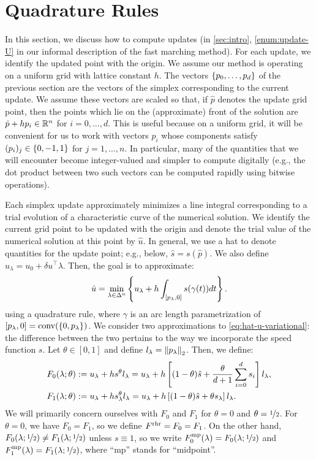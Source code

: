\documentclass[eikonal.tex]{subfiles}
\begin{document}
\section{Quadrature Rules}

In this section, we discuss how to compute updates (in
\cref{sec:intro}, \cref{enum:update-U} in our informal description of
the fast marching method). For each update, we identify the updated
point with the origin. We assume our method is operating on a uniform
grid with lattice constant $h$. The vectors $\left\{p_0, \hdots, p_d\right\}$
of the previous section are the vectors of the simplex corresponding
to the current update. We assume these vectors are scaled so that, if
$\hat{p}$ denotes the update grid point, then the points which lie on
the (approximate) front of the solution are $\hat{p} + h p_i \in \mathbb{R}^n$
for $i = 0, \hdots, d$. This is useful because on a uniform grid, it
will be convenient for us to work with vectors $p_i$ whose components
satisfy $(p_i)_j \in \left\{0, -1, 1\right\}$ for $j = 1, \hdots, n$. In
particular, many of the quantities that we will encounter become
integer-valued and simpler to compute digitally (e.g., the dot product
between two such vectors can be computed rapidly using bitwise
operations).

Each simplex update approximately minimizes a line integral
corresponding to a trial evolution of a characteristic curve of the
numerical solution. We identify the current grid point to be updated
with the origin and denote the trial value of the numerical solution
at this point by $\hat{u}$. In general, we use a hat to denote
quantities for the update point; e.g., below, $\hat{s} =
s(\hat{p})$. We also define $u_\lambda = u_0 + \delta u^\top
\lambda$. Then, the goal is to approximate:
\begin{equation}
  \hat{u} = \min_{\lambda \in \Delta^n} \left\{u_\lambda + h \int_{[p_\lambda, 0]} s(\gamma(t))dt\right\}.\label{eq:hat-u-variational}
\end{equation}
using a quadrature rule, where $\gamma$ is an arc length
parametrization of
$[p_\lambda, 0] = \operatorname{conv}(\left\{0, p_\lambda\right\})$. We
consider two approximations to \cref{eq:hat-u-variational}: the
difference between the two pertains to the way we incorporate the
speed function $s$. Let $\theta \in [0, 1]$ and define
$l_\lambda = \left\|p_\lambda\right\|_2$. Then, we define:
\begin{align*}
  F_0(\lambda; \theta) &:= u_\lambda + h s^{\theta} l_\lambda = u_\lambda + h \left[(1-\theta)\hat{s} + \frac{\theta}{d + 1} \sum_{i=0}^d s_i\right] l_\lambda, \\
  F_1(\lambda; \theta) &:= u_\lambda + h s^{\theta}_\lambda l_\lambda = u_\lambda + h \left[(1-\theta)\hat{s} + \theta s_\lambda\right] l_\lambda.
\end{align*}
We will primarily concern ourselves with $F_0$ and $F_1$ for
$\theta = 0$ and $\theta = \nicefrac{1}{2}$. For $\theta = 0$, we have
$F_0 = F_1$, so we define $F^{\operatorname{rhr}} = F_0 = F_1$. On the other hand,
$F_0(\lambda;\nicefrac{1}{2}) \neq F_1(\lambda;\nicefrac{1}{2})$
unless $s \equiv 1$, so we write
$F_0^{\operatorname{mp}}(\lambda) = F_0(\lambda; \nicefrac{1}{2})$ and
$F_1^{\operatorname{mp}}(\lambda) = F_1(\lambda; \nicefrac{1}{2})$, where ``mp''
stands for ``midpoint''.
\end{document}
